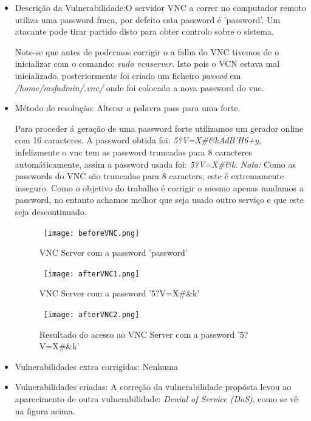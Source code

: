 \begin{itemize}
\item Descrição da Vulnerabilidade:O servidor VNC a correr no computador remoto utiliza uma password fraca, por defeito esta password é 'password'. Um atacante pode tirar partido disto para obter controlo sobre o sistema.
\par Note-se que antes de podermos corrigir o a falha do VNC tivemos de o inicializar com o comando: \textit{sudo vcnserver}. Isto pois o VCN estava mal inicializado, posteriormente foi criado um ficheiro \textit{passwd} em \textit{/home/msfadmin/.vnc/} onde foi colocada a nova password do vnc.

\item Método de resolução: Alterar a palavra pass para uma forte.
\par Para proceder á geração de uma password forte utilizamos um gerador online com 16 caracteres. A password obtida foi: \textit{5?V=X\#\&kAdB'H6+y}, infelizmente o vnc tem as password truncadas para 8 caracteres automáticamente, assim a password usada foi: \textit{5?V=X\#\&k}.\newline
\textit{Nota:} Como as passwords do VNC são truncadas para 8 caracters, este é extremamente inseguro. Como o objetivo do trabalho é corrigir o mesmo apenas mudamos a password, no entanto achamos melhor que seja usado outro serviço e que este seja descontinuado.
\begin{figure}[H]

  \centering

  \hbox{\hspace{-6em} \texttt{[image: beforeVNC.png]}}

  \caption {VNC Server com a password 'password'}

  \label {fig3}

\end{figure}
\begin{figure}[H]

  \centering

  \hbox{\hspace{-6em} \texttt{[image: afterVNC1.png]}}

  \caption {VNC Server com a password '5?V=X\#\&k'}

  \label {fig3}

\end{figure}
\begin{figure}[H]

  \centering

  \hbox{\hspace{-6em} \texttt{[image: afterVNC2.png]}}

  \caption {Resultado do acesso ao VNC Server com a password '5?V=X\#\&k'}

  \label {fig3}

\end{figure}
\item Vulnerabilidades extra corrigidas: Nenhuma
\item Vulnerabilidades criadas: A correção da vulnerabilidade propósta levou ao aparecimento de outra vulnerabilidade: \textit{Denial of Service (DoS)}, como se vê na figura acima.
\end{itemize}
